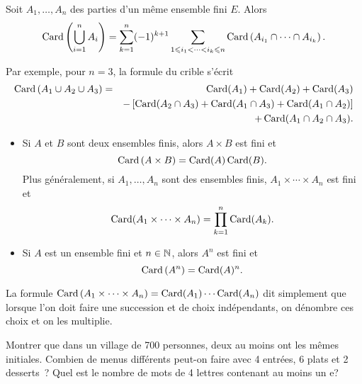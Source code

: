 \documentclass{magnolia}
\begin{document}
\begin{proposition}[nom={Formule du crible}]
Soit $A_1,\ldots,A_n$ des parties d'un même ensemble fini $E$. Alors
  \[\operatorname{Card}\left(\bigcup_{i=1}^n A_i\right)=\sum_{k=1}^n (-1)^{k+1}
    \sum_{1\leqslant i_1<\cdots<i_k\leqslant n}
    \operatorname{Card}\left(A_{i_1}\cap\cdots\cap A_{i_k}\right).\]
\end{proposition}

\begin{remarqueUnique}
\remarque   Par exemple, pour $n=3$, la formule du crible s'écrit
\begin{eqnarray*}
\operatorname{Card}\left(A_1\cup A_2\cup A_3\right)&=&\operatorname{Card}(A_1)+\operatorname{Card}(A_2)+\operatorname{Card}(A_3)\\
  & & - \left[\operatorname{Card}(A_2\cap A_3)+\operatorname{Card}(A_1\cap A_3)+\operatorname{Card}(A_1\cap A_2)\right]\\
& &+\operatorname{Card}(A_1\cap A_2\cap A_3).
\end{eqnarray*}
\end{remarqueUnique}

\begin{proposition}
\begin{itemize}
\item Si $A$ et $B$ sont deux ensembles finis, alors $A\times B$ est fini et
  \[\operatorname{Card}\left(A\times B\right)=\operatorname{Card}(A)\operatorname{Card}(B).\]
  Plus généralement, si $A_1,\ldots,A_n$ sont des ensembles finis,
  $A_1\times\cdots\times A_n$ est fini et
  \[\operatorname{Card}(A_1\times \cdots\times A_n)=\prod_{k=1}^n \operatorname{Card}(A_k).\]
\item Si $A$ est un ensemble fini et $n\in\mathbb{N}$, alors $A^n$ est fini et
  \[\operatorname{Card}\left(A^n\right)=\operatorname{Card}(A)^n.\]
\end{itemize}
\end{proposition}


\begin{remarqueUnique}
\remarque La formule $\operatorname{Card}\left(A_1 \times \dots \times A_n\right)=\operatorname{Card}(A_1)\cdots\operatorname{Card}(A_n)$ dit
  simplement que lorsque l'on doit faire une succession \og et \fg de choix indépendants,
  on dénombre ces choix et on les multiplie.
\end{remarqueUnique}

\begin{exos}
\exo Montrer que dans un village de 700 personnes, deux au moins ont les mêmes initiales.
\exo Combien de menus différents peut-on faire avec 4 entrées, 6 plats et 2 desserts~?
\exo Quel est le nombre de mots de 4 lettres contenant au moins un \og e\fg ? 
\end{exos}
  
\end{document}

